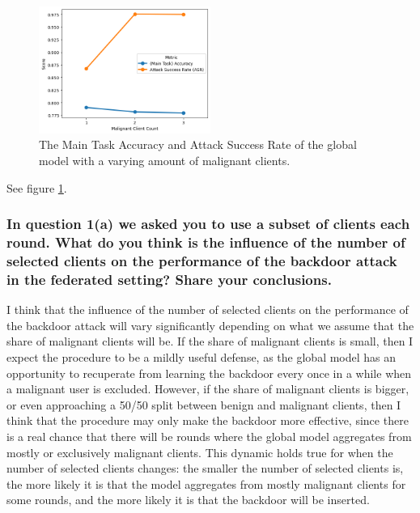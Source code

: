 \documentclass{article}
\begin{document}
\begin{figure}[h]
    \centering
    \includegraphics[width=0.5\textwidth]{malignant_client_count.png}
    \caption{The Main Task Accuracy and Attack Success Rate of the global model with a varying amount of malignant clients.}
    \label{fig:malignant_client_count}
\end{figure}

See figure \ref{fig:malignant_client_count}.

\subsubsection{In question 1(a) we asked you to use a subset of clients each round.
What do you think is the influence of the number of selected clients on the
performance of the backdoor attack in the federated setting? Share your conclusions.}
I think that the influence of the number of selected clients on the performance of the backdoor attack will vary significantly depending on what we assume that the share of malignant clients will be.
If the share of malignant clients is small, then I expect the procedure to be a mildly useful defense, as the global model has an opportunity to recuperate from learning the backdoor every once in a while when a malignant user is excluded.
However, if the share of malignant clients is bigger, or even approaching a 50/50 split between benign and malignant clients, then I think that the procedure may only make the backdoor more effective, since there is a real chance that there will be rounds where the global model aggregates from mostly or exclusively malignant clients.
This dynamic holds true for when the number of selected clients changes: the smaller the number of selected clients is, the more likely it is that the model aggregates from mostly malignant clients for some rounds, and the more likely it is that the backdoor will be inserted.
\end{document}
